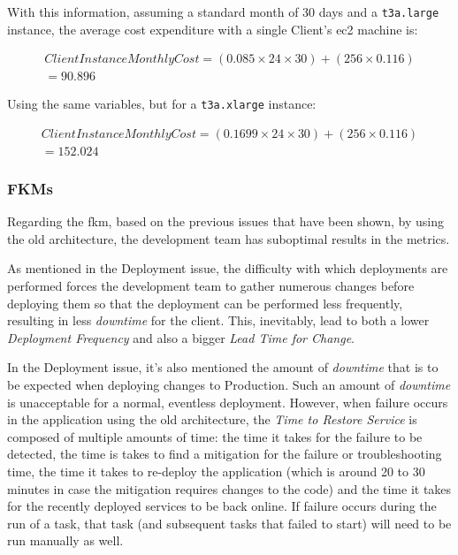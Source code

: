 With this information, assuming a standard month of 30 days and a \texttt{t3a.large} instance, the average cost expenditure with a single Client's \gls{ec2} machine is:

\begin{align}
    \label{eq:ec2-instance-cost-t3alarge}
    Client Instance Monthly Cost = (0.085 \times 24 \times  30) + (256 \times  0.116)\\
    = 90.896
    \end{align}

Using the same variables, but for a \texttt{t3a.xlarge} instance:

\begin{align}
    \label{eq:ec2-instance-cost-t3axlarge}
    Client Instance Monthly Cost = (0.1699 \times 24 \times  30) + (256 \times  0.116)\\
    = 152.024
\end{align}



\subsubsection{FKMs}\label{methodology:sss:fkms}

Regarding the \gls{fkm}, based on the previous issues that have been shown, by using the old architecture, the development team has suboptimal results in the metrics.

As mentioned in the Deployment issue, the difficulty with which deployments are performed forces the development team to gather numerous changes before deploying them so that the deployment can be performed less frequently, resulting in less \textit{downtime} for the client. This, inevitably, lead to both a lower \textit{Deployment Frequency} and also a bigger \textit{Lead Time for Change}.

In the Deployment issue, it's also mentioned the amount of \textit{downtime} that is to be expected when deploying changes to Production. Such an amount of \textit{downtime} is unacceptable for a normal, eventless deployment. However, when failure occurs in the application using the old architecture, the \textit{Time to Restore Service} is composed of multiple amounts of time: the time it takes for the failure to be detected, the time is takes to find a mitigation for the failure or troubleshooting time, the time it takes to re-deploy the application (which is around 20 to 30 minutes in case the mitigation requires changes to the code) and the time it takes for the recently deployed services to be back online. If failure occurs during the run of a task, that task (and subsequent tasks that failed to start) will need to be run manually as well. 


